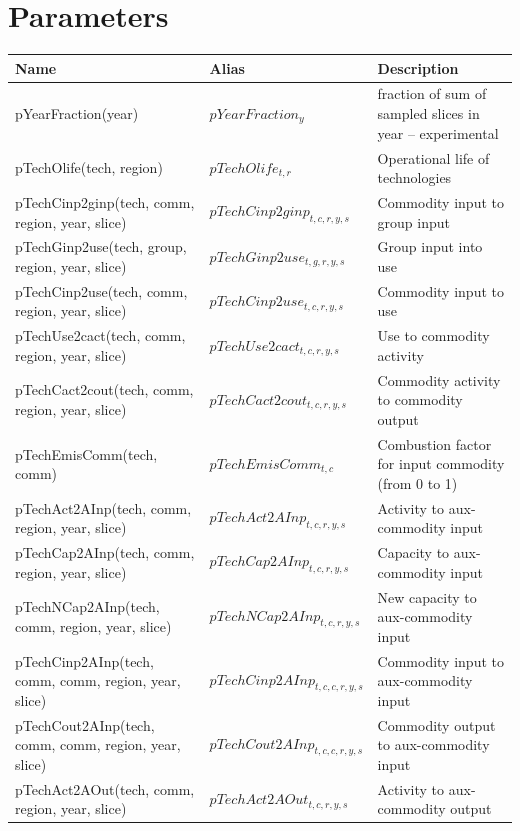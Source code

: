\documentclass{article}
\begin{document}
\section*{Parameters}
\begin{longtable}{|p{10cm}|p{5cm}|p{9cm}|}
\hline
\bf{Name} & \bf{Alias}  & \bf{Description} \\ 
 \hline
pYearFraction(year) & $pYearFraction_{y}$ & fraction of sum of sampled slices in year -- experimental \\ 
 \hline
pTechOlife(tech, region) & $pTechOlife_{t,r}$ & Operational life of technologies \\ 
 \hline
pTechCinp2ginp(tech, comm, region, year, slice) & $pTechCinp2ginp_{t,c,r,y,s}$ & Commodity input to group input \\ 
 \hline
pTechGinp2use(tech, group, region, year, slice) & $pTechGinp2use_{t,g,r,y,s}$ & Group input into use \\ 
 \hline
pTechCinp2use(tech, comm, region, year, slice) & $pTechCinp2use_{t,c,r,y,s}$ & Commodity input to use \\ 
 \hline
pTechUse2cact(tech, comm, region, year, slice) & $pTechUse2cact_{t,c,r,y,s}$ & Use to commodity activity \\ 
 \hline
pTechCact2cout(tech, comm, region, year, slice) & $pTechCact2cout_{t,c,r,y,s}$ & Commodity activity to commodity output \\ 
 \hline
pTechEmisComm(tech, comm) & $pTechEmisComm_{t,c}$ & Combustion factor for input commodity (from 0 to 1) \\ 
 \hline
pTechAct2AInp(tech, comm, region, year, slice) & $pTechAct2AInp_{t,c,r,y,s}$ & Activity to aux-commodity input \\ 
 \hline
pTechCap2AInp(tech, comm, region, year, slice) & $pTechCap2AInp_{t,c,r,y,s}$ & Capacity to aux-commodity input \\ 
 \hline
pTechNCap2AInp(tech, comm, region, year, slice) & $pTechNCap2AInp_{t,c,r,y,s}$ & New capacity to aux-commodity input \\ 
 \hline
pTechCinp2AInp(tech, comm, comm, region, year, slice) & $pTechCinp2AInp_{t,c,c,r,y,s}$ & Commodity input to aux-commodity input \\ 
 \hline
pTechCout2AInp(tech, comm, comm, region, year, slice) & $pTechCout2AInp_{t,c,c,r,y,s}$ & Commodity output to aux-commodity input \\ 
 \hline
pTechAct2AOut(tech, comm, region, year, slice) & $pTechAct2AOut_{t,c,r,y,s}$ & Activity to aux-commodity output \\ 

\end{longtable}
\end{document}
